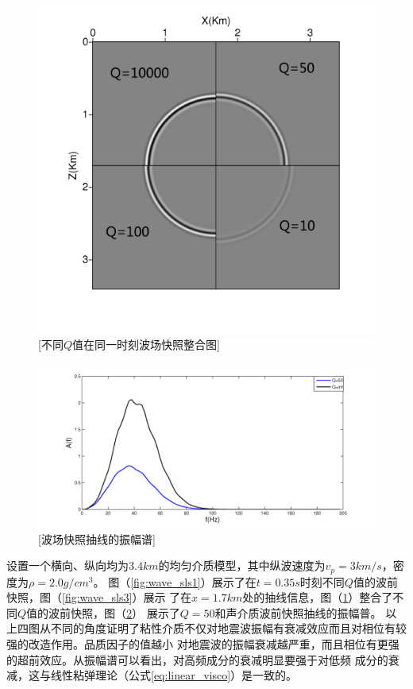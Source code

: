 \begin{figure}[!htbp]
	    \centering
		\includegraphics[width=0.5\linewidth]{figure/wave_sls2}
		[不同$Q$值在同一时刻波场快照整合图]
		\label{fig:wave_sls2}
\end{figure}
\begin{figure}[!htbp]
	    \centering
		\includegraphics[width=0.7\linewidth]{figure/wave_sls4}
		[波场快照抽线的振幅谱]
		\label{fig:wave_sls4}
\end{figure}
设置一个横向、纵向均为$3.4km$的均匀介质模型，其中纵波速度为$v_p=3km/s$，密度为$\rho=2.0g/cm^3$。
图（\ref{fig:wave_sls1}）展示了在$t=0.35s$时刻不同$Q$值的波前快照，图（\ref{fig:wave_sls3}）展示
了在$x=1.7km$处的抽线信息，图（\ref{fig:wave_sls2}）整合了不同$Q$值的波前快照，图（\ref{fig:wave_sls4}）
展示了$Q=50$和声介质波前快照抽线的振幅普。
以上四图从不同的角度证明了粘性介质不仅对地震波振幅有衰减效应而且对相位有较强的改造作用。品质因子的值越小
对地震波的振幅衰减越严重，而且相位有更强的超前效应。从振幅谱可以看出，对高频成分的衰减明显要强于对低频
成分的衰减，这与线性粘弹理论（公式\ref{eq:linear_visco}）是一致的。



\vspace{0.5cm}
